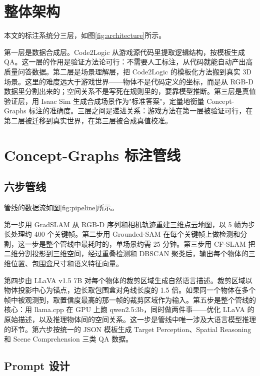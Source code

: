
\section{整体架构}

本文的标注系统分三层，如图\ref{fig:architecture}所示。



第一层是数据合成层。Code2Logic 从游戏源代码里提取逻辑结构，按模板生成 QA。这一层的作用是验证方法论可行：不需要人工标注，从代码就能自动产出高质量问答数据。第二层是场景理解层，把 Code2Logic 的模板化方法搬到真实 3D 场景。这里的难度远大于游戏世界——物体不是代码定义的坐标，而是从 RGB-D 数据里分割出来的；空间关系不是写死在规则里的，要靠模型推断。第三层是真值验证层，用 Isaac Sim 生成合成场景作为"标准答案"，定量地衡量 Concept-Graphs 标注的准确度。三层之间是递进关系：游戏方法在第一层被验证可行，在第二层被迁移到真实世界，在第三层被合成真值校准。

\section{Concept-Graphs 标注管线}

\subsection{六步管线}

管线的数据流如图\ref{fig:pipeline}所示。



第一步用 GradSLAM\cite{gradslam} 从 RGB-D 序列和相机轨迹重建三维点云地图，以 5 帧为步长处理约 400 个关键帧。第二步用 Grounded-SAM\cite{grounded_sam} 在每个关键帧上做检测和分割，这一步是整个管线中最耗时的，单场景约需 25 分钟。第三步用 CF-SLAM 把二维分割投影到三维空间，经过重叠检测和 DBSCAN 聚类后，输出每个物体的三维位置、包围盒尺寸和语义特征向量。

第四步由 LLaVA v1.5 7B\cite{llava} 对每个物体的裁剪区域生成自然语言描述。裁剪区域以物体投影中心为锚点，边长取包围盒对角线长度的 1.5 倍。如果同一个物体在多个帧中被观测到，取置信度最高的那一帧的裁剪区域作为输入。第五步是整个管线的核心：用 llama.cpp 在 GPU 上跑 qwen2.5:3b\cite{qwen2_5}，同时做两件事——优化 LLaVA 的原始描述，以及推理物体间的空间关系。这一步是管线中唯一涉及大语言模型推理的环节。第六步按统一的 JSON 模板生成 Target Perception、Spatial Reasoning 和 Scene Comprehension 三类 QA 数据。

\subsection{Prompt 设计}

